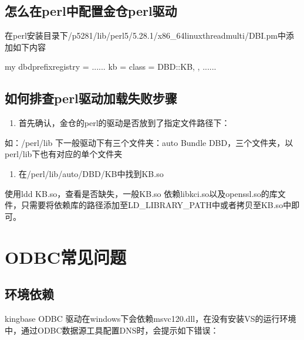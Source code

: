 \documentclass[letterpaper,10pt,english]{sphinxmanual}
\begin{document}
\subsection{怎么在perl中配置金仓perl驱动}
\label{\detokenize{interface/perl:perlperl}}
在perl安装目录下/p5281/lib/perl5/5.28.1/x86\_64\sphinxhyphen{}linux\sphinxhyphen{}thread\sphinxhyphen{}multi/DBI.pm中添加如下内容

\begin{sphinxVerbatim}[commandchars=\\\{\}]
my \PYGZdl{}dbd\PYGZus{}prefix\PYGZus{}registry = \PYGZob{}
                                               ......
                                               kb\PYGZus{}          =\PYGZgt{} \PYGZob{} class  =\PYGZgt{} \PYGZsq{}DBD::KB\PYGZsq{},      \PYGZcb{},
                                              ......
\PYGZcb{}
\end{sphinxVerbatim}


\subsection{如何排查perl驱动加载失败步骤}
\label{\detokenize{interface/perl:id3}}\begin{enumerate}
%
\item {} 
首先确认，金仓的perl的驱动是否放到了指定文件路径下：

\end{enumerate}

如：/perl/lib 下一般驱动下有三个文件夹：auto Bundle DBD，三个文件夹，以perl/lib下也有对应的单个文件夹
\begin{enumerate}
%
\setcounter{enumi}{1}
\item {} 
在/perl/lib/auto/DBD/KB中找到KB.so

\end{enumerate}

使用ldd KB.so，查看是否缺失，一般KB.so 依赖libkci.so以及openssl.so的库文件，只需要将依赖库的路径添加至LD\_LIBRARY\_PATH中或者拷贝至KB.so中即可。


\section{ODBC常见问题}
\label{\detokenize{interface/odbc:odbc}}\label{\detokenize{interface/odbc::doc}}

\subsection{环境依赖}
\label{\detokenize{interface/odbc:id1}}
kingbase ODBC 驱动在windows下会依赖msvc120.dll，在没有安装VS的运行环境中，通过ODBC数据源工具配置DNS时，会提示如下错误：
\end{document}

